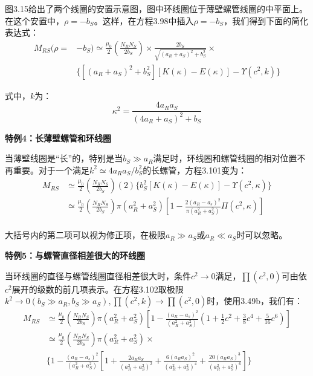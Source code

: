 图3.15给出了两个线圈的安置示意图，图中环线圈位于薄壁螺管线圈的中平面上。在这个安置中，$\rho=-b_S$。这样，在方程3.98中插入$\rho=-b_S$，我们得到下面的简化表达式：
  \begin{equation}
  \begin{split}
M_{RS}(\rho=&-b_S)\simeq\frac{\mu_0}{2}(\frac{N_R N_S}{2b_S})\times\frac{2b_S}{\sqrt{(a_R+a_S)^2+b_S^2}}\times\\
&\{[(a_R+a_S)^2+b_S^2][K(\kappa)-E(\kappa)]-\Upsilon(c^2,k)\}%
\end{split}
\end{equation}

  式中，$k$为：
  \begin{equation*}
\kappa^2=\frac{4a_Ra_S}{(4a_R+a_S)^2+b_S}%
\end{equation*}

\textbf{特例4：长薄壁螺管和环线圈} 

当薄壁线圈是“长”的，特别是当$b_S\gg a_R$满足时，环线圈和螺管线圈的相对位置不再重要。对于一个满足$k^2\simeq 4a_R a_S/b_S^2$的长螺管，方程3.101变为：
\begin{equation}
\begin{split}
M_{RS}&\simeq\frac{\mu_0}{2}(\frac{N_RN_S}{2b_S})(2)\{b_S^2[K(\kappa)-E(\kappa)]-\Upsilon(c^2,\kappa)\}\\
&\simeq\frac{\mu_0}{2}(\frac{N_RN_S}{2b_S})\pi(a_R^2+a_S^2)[1-\frac{2(a_R-a_s)^2}{\pi(a_R^2+a_S^2)}\Pi(c^2,\kappa)]\\%
\end{split}
\end{equation}

大括号内的第二项可以视为修正项，在极限$ a_R\gg a_S$或$a_R\ll a_S$时可以忽略。

\textbf{特例5：与螺管直径相差很大的环线圈} 

当环线圈的直径与螺管线圈直径相差很大时，条件$c^2\rightarrow 0$满足，$\prod(c^2,0)$可由依$c^2$展开的级数的前几项表示。在方程3.102取极限$k^2\rightarrow 0(b_S\gg a_R,b_S\gg a_S),\prod(c^2,k)\rightarrow \prod(c^2,0)$时，使用3.49b，我们有：
  \begin{equation}
\begin{split}
M_{RS}&\simeq\frac{\mu_0}{2}(\frac{N_RN_S}{2b_S})\pi(a_R^2+a_S^2)[1-\frac{(a_R-a_s)^2}{(a_R^2+a_S^2)}(1+\frac{1}{2}c^2+\frac{3}{8}c^4+\frac{5}{16}c^6)]\\
&\simeq\frac{\mu_0}{2}(\frac{N_RN_S}{2b_S})\pi(a_R^2+a_S^2)\times \\
&\{1-\frac{(a_R-a_s)^2}{(a_R^2+a_S^2)}[1+\frac{2a_Ra_S}{(a_R^2+a_S^2)^2}+\frac{6(a_Ra_S)^2}{(a_R^2+a_S^2)^4}+\frac{20(a_Ra_S)^3}{(a_R^2+a_S^2)^6}]\}%
\end{split}
\end{equation}

